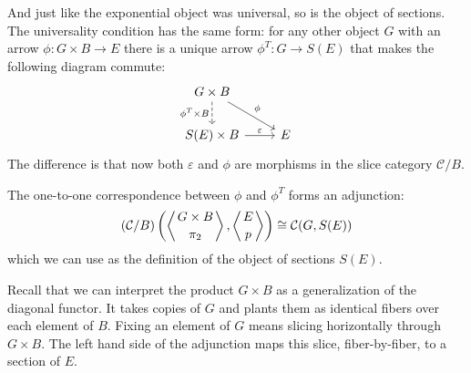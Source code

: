 \documentclass[DaoFP]{subfiles}
\begin{document}
And just like the exponential object was universal, so is the object of sections. The universality condition has the same form: for any other object $G$ with an arrow $\phi \colon G \times B \to E$ there is a unique arrow $\phi^T \colon G \to S(E)$ that makes the following diagram commute:
\[
 \begin{tikzcd}
 G \times B
 \arrow[d, dashed, "\phi^T \times B"']
 \arrow[dr, "\phi"]
 \\
 S(E) \times B
 \arrow[r, "\varepsilon"]
 &E
  \end{tikzcd}
\]
The difference is that now both $\varepsilon$ and $\phi$ are morphisms in the slice category $\mathcal{C}/B$. 

The one-to-one correspondence between $\phi$ and $\phi^T$ forms an adjunction:
\[(\mathcal{C}/B) \left( \left \langle {G\times B \atop \pi_2} \right \rangle , \left \langle {E \atop p } \right \rangle \right) \cong \mathcal{C} (G, S(E)) \]
which we can use as the definition of the object of sections $S(E)$. 

Recall that we can interpret the product $G \times B$ as a generalization of the diagonal functor. It takes copies of $G$ and plants them as identical fibers over each element of $B$. Fixing an element of $G$ means slicing horizontally through $G \times B$. The left hand side of the adjunction maps this slice, fiber-by-fiber, to a section of $E$.
\end{document}
